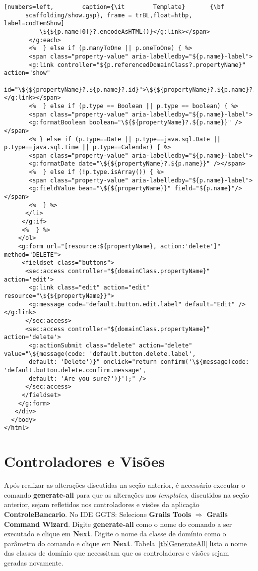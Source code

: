 \begin{lstlisting}[numbers=left,        caption={\it        Template}       {\bf
      scaffolding/show.gsp}, frame = trBL,float=htbp, label=codTemShow]
          \${${p.name[0]}?.encodeAsHTML()}</g:link></span>
       </g:each>
       <%  } else if (p.manyToOne || p.oneToOne) { %>
       <span class="property-value" aria-labelledby="${p.name}-label">
       <g:link controller="${p.referencedDomainClass?.propertyName}" action="show" 
       id="\${${propertyName}?.${p.name}?.id}">\${${propertyName}?.${p.name}?.encodeAsHTML()}</g:link></span>
       <%  } else if (p.type == Boolean || p.type == boolean) { %>
       <span class="property-value" aria-labelledby="${p.name}-label">
       <g:formatBoolean boolean="\${${propertyName}?.${p.name}}" /></span>
       <% } else if (p.type==Date || p.type==java.sql.Date || p.type==java.sql.Time || p.type==Calendar) { %>
       <span class="property-value" aria-labelledby="${p.name}-label">
       <g:formatDate date="\${${propertyName}?.${p.name}}" /></span>
       <%  } else if (!p.type.isArray()) { %>
       <span class="property-value" aria-labelledby="${p.name}-label">
       <g:fieldValue bean="\${${propertyName}}" field="${p.name}"/></span>
       <%  } %>
      </li>
     </g:if>
     <%  } %>
    </ol>
    <g:form url="[resource:${propertyName}, action:'delete']" method="DELETE">
     <fieldset class="buttons">
      <sec:access controller="${domainClass.propertyName}" action='edit'>
       <g:link class="edit" action="edit" resource="\${${propertyName}}">
       <g:message code="default.button.edit.label" default="Edit" /></g:link>
      </sec:access>
      <sec:access controller="${domainClass.propertyName}" action='delete'>
       <g:actionSubmit class="delete" action="delete" value="\${message(code: 'default.button.delete.label', 
       default: 'Delete')}" onclick="return confirm('\${message(code: 'default.button.delete.confirm.message', 
       default: 'Are you sure?')}');" />
      </sec:access>
     </fieldset>
    </g:form>
   </div>
  </body>
</html>
\end{lstlisting}

\newpage

\section{Controladores e Visões}

Após realizar as alterações discutidas  na seção anterior, é necessário executar
o  comando  {\bf generate-all}  para  que  as  alterações nos  {\it  templates},
discutidos na  seção anterior,  sejam refletidos nos  controladores e  visões da
aplicação  {\bf ControleBancario}.  No  IDE GGTS:  Selecione {\bf  Grails Tools}
$\Longrightarrow$ {\bf Grails Command Wizard}.  Digite {\bf generate-all} como o
nome do comando a ser executado e clique em {\bf Next}.  Digite o nome da classe
de    domínio   como    o   parâmetro    do   comando    e   clique    em   {\bf
  Next}.  Tabela~\ref{tblGenerateAll} lista o  nome das  classes de  domínio que
necessitam que os controladores e visões sejam geradas novamente.

